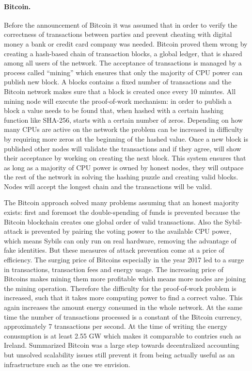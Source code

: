 \paragraph{Bitcoin.}
Before the announcement of Bitcoin it was assumed that in order to verify the correctness of 
transactions between parties and prevent cheating with digital money a bank or credit card company
was needed. Bitcoin proved them wrong by creating a hash-based chain of transaction blocks, a global 
ledger, that is shared among all users of the network. The acceptance of transactions is managed by 
a process called ``mining'' which ensures that only the majority of CPU power can publish new 
block. A blocks contains a fixed number of transactions and the Bitcoin network makes sure that a
block is created once every 10 minutes. All mining node will execute the proof-of-work mechanism: 
in order to publish a block a value needs to be found that, when hashed with a certain hashing 
function like SHA-256, starts with a certain number of zeros. Depending on how many CPUs are active
on the network the problem can be increased in difficulty by requiring more zeros at the beginning 
of the hashed value. Once a new block is published other nodes will validate the transactions and 
if they agree, will show their acceptance by working on creating the next block. This system ensures
that as long as a majority of CPU power is owned by honest nodes, they will outpace the rest of the
network in solving the hashing puzzle and creating valid blocks. Nodes will accept the longest chain
and the transactions will be valid.

The Bitcoin approach solved many problems assuming that an honest majority exists: first and 
foremost the double-spending of funds is prevented because the Bitcoin blockchain creates one global
order of valid transactions. Also the Sybil-attack is prevented by pairing the voting power to the
available CPU power, which means Sybils can only run on real hardware, removing the advantage of
fake identities. But these measures of attack prevention come at a price of efficiency. The surging 
price of Bitcoins especially in the year 2017 led to a surge in transactions, transaction fees and
energy usage. The increasing price of Bitcoins makes mining them more profitable which means more 
nodes are joining the mining operation. Therefore the difficulty for the proof-of-work problem is 
increased, such that it takes more computing power to find a correct value. This again increases the
amount energy consumed in the whole network. At the same time the number of transactions processed
is a constant of the Bitcoin currency, approximately 7 transactions per second. At the time of 
writing the energy conusmption is at least 2.55 GW which makes it comparable to contries such as 
Ireland. Summarized Bitcoin was a large step towards decentralized accounting but unsolved 
scalability issues still prevent it from being actually useful as an infrastructure such as the one 
we envision.

